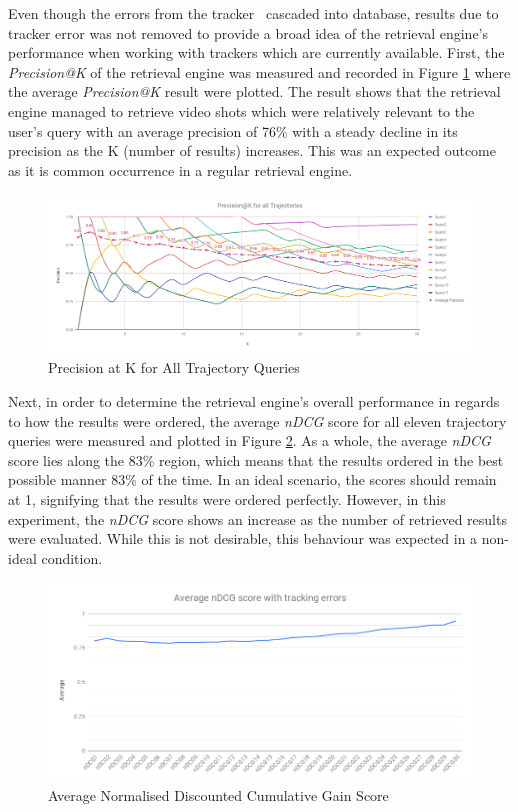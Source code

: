 Even though the errors from the tracker~\cite{lim2017} cascaded into database, results due to tracker error was not removed to provide a broad idea of the retrieval engine's performance when working with trackers which are currently available. 
First, the \textit{Precision@K} of the retrieval engine was measured
and recorded in Figure \ref{fig:versionTwoPreAtK} where the 
average \textit{Precision@K} result were plotted. The result shows that the retrieval engine
managed to retrieve video shots which were relatively relevant to the user's
query with an average precision of 76\% with a steady decline in its precision
as the K (number of results) increases. This was an expected outcome as it is
common occurrence in a regular retrieval engine.

\begin{figure}[!ht]
  \centering
    \includegraphics[width=\linewidth]{image/retrievalTwo/p@k.png}
  \caption{Precision at K for All Trajectory Queries}
  \label{fig:versionTwoPreAtK}
\end{figure}

Next, in order to determine the retrieval engine's overall performance in
regards to how the results were ordered, the average \textit{nDCG} score for
all eleven trajectory queries were measured and plotted in Figure
\ref{fig:ndcgWithError}. As a whole, the average \textit{nDCG} score lies along
the 83\% region, which means that the results ordered in the best possible
manner 83\% of the time.
In an ideal scenario, the scores should remain at 1, signifying that the
results were ordered perfectly. However, in this experiment, the \textit{nDCG}
score shows an increase as the number of retrieved results were evaluated.
While this is not desirable, this behaviour was expected in a non-ideal
condition.

\begin{figure}[!ht]
  \centering
    \includegraphics[width=0.9\linewidth]{image/retrievalTwo/averageNDCG.png}
  \caption{Average Normalised Discounted Cumulative Gain Score}
  \label{fig:ndcgWithError}
\end{figure}

